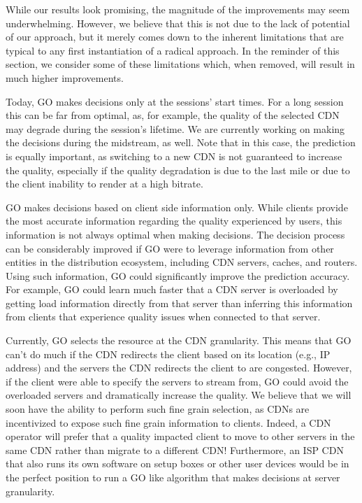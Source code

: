 
While our results look promising, the magnitude of the improvements
may seem underwhelming. However, we believe that this is not due to
the lack of potential of our approach, but it merely comes down to the
inherent limitations that are typical to any first instantiation of a
radical approach. In the reminder of this section, we consider some of
these limitations which, when removed, will result in much higher
improvements.

 Today, GO makes decisions only at
the sessions' start times. For a long session this can be far from
optimal, as, for example, the quality of the selected CDN may degrade
during the session's lifetime. We are currently working on making the
decisions during the midstream, as well. Note that in this case, the
prediction is equally important, as switching to a new CDN is not
guaranteed to increase the quality, especially if the quality
degradation is due to the last mile or due to the client inability to
render at a high bitrate.

 GO makes
decisions based on client side information only. While clients provide
the most accurate information regarding the quality experienced by
users, this information is not always optimal when making
decisions. The decision process can be considerably improved if GO
were to leverage information from other entities in the distribution
ecosystem, including CDN servers, caches, and routers. Using such
information, GO could significantly improve the prediction
accuracy. For example, GO could learn much faster that a CDN server is
overloaded by getting load information directly from that server than
inferring this information from clients that experience quality issues
when connected to that server.

 Currently, GO selects the resource
 at the CDN granularity. This means that GO can't do much if the CDN
 redirects the client based on its location (e.g., IP address) and the
 servers the CDN redirects the client to are congested. However, if
 the client were able to specify the servers to stream from, GO could
 avoid the overloaded servers and dramatically increase the
 quality. We believe that we will soon have the ability to perform
 such fine grain selection, as CDNs are incentivized to expose such
 fine grain information to clients. Indeed, a CDN operator will prefer
 that a quality impacted client to move to other servers in the same
 CDN rather than migrate to a different CDN! Furthermore, an ISP CDN
 that also runs its own software on setup boxes or other user devices
 would be in the perfect position to run a GO like algorithm that
 makes decisions at server granularity.

